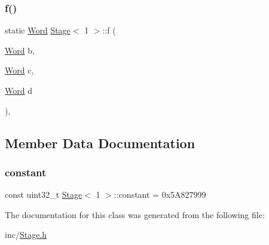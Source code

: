 \subsubsection{\texorpdfstring{f()}{f()}}
{\footnotesize\ttfamily static \mbox{\hyperlink{class_word}{Word}} \mbox{\hyperlink{class_stage}{Stage}}$<$ 1 $>$\+::f (\begin{DoxyParamCaption}\item[{\mbox{\hyperlink{class_word}{Word}}}]{b,  }\item[{\mbox{\hyperlink{class_word}{Word}}}]{c,  }\item[{\mbox{\hyperlink{class_word}{Word}}}]{d }\end{DoxyParamCaption})\hspace{0.3cm}{\ttfamily [inline]}, {\ttfamily [static]}}



\subsection{Member Data Documentation}
\mbox{\label{class_stage_3_011_01_4_a5b98ce9d68980826e71d133475bc3f1c}} 
\subsubsection{\texorpdfstring{constant}{constant}}
{\footnotesize\ttfamily const uint32\+\_\+t \mbox{\hyperlink{class_stage}{Stage}}$<$ 1 $>$\+::constant = 0x5\+A827999\hspace{0.3cm}{\ttfamily [static]}}



The documentation for this class was generated from the following file\+:\begin{DoxyCompactItemize}
\item 
inc/\mbox{\hyperlink{_stage_8h}{Stage.\+h}}\end{DoxyCompactItemize}
